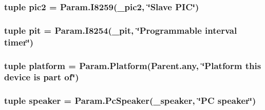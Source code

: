 \label{classSouthBridge_1_1SouthBridge_a6962be624c6ef72d6f9bab2eaeb6b188}
\hypertarget{classSouthBridge_1_1SouthBridge_aaeda2daedd8669c817d979b24786a533}{
\subsubsection[{pic2}]{\setlength{\rightskip}{0pt plus 5cm}tuple {\bf pic2} = Param.I8259({\bf \_\-pic2}, \char`\"{}Slave PIC\char`\"{})}}
\label{classSouthBridge_1_1SouthBridge_aaeda2daedd8669c817d979b24786a533}
\hypertarget{classSouthBridge_1_1SouthBridge_a5f9a4e8ee268919eef3700174e7db103}{
\subsubsection[{pit}]{\setlength{\rightskip}{0pt plus 5cm}tuple {\bf pit} = Param.I8254({\bf \_\-pit}, \char`\"{}Programmable interval timer\char`\"{})}}
\label{classSouthBridge_1_1SouthBridge_a5f9a4e8ee268919eef3700174e7db103}
\hypertarget{classSouthBridge_1_1SouthBridge_ae6d09ca44893db6cdb66d62deaa1aefd}{
\subsubsection[{platform}]{\setlength{\rightskip}{0pt plus 5cm}tuple {\bf platform} = Param.Platform(Parent.any, \char`\"{}Platform this device is part of\char`\"{})}}
\label{classSouthBridge_1_1SouthBridge_ae6d09ca44893db6cdb66d62deaa1aefd}
\hypertarget{classSouthBridge_1_1SouthBridge_a05a57a2974f0aeff7ea53b64039e080a}{
\subsubsection[{speaker}]{\setlength{\rightskip}{0pt plus 5cm}tuple {\bf speaker} = Param.PcSpeaker({\bf \_\-speaker}, \char`\"{}PC {\bf speaker}\char`\"{})}}
